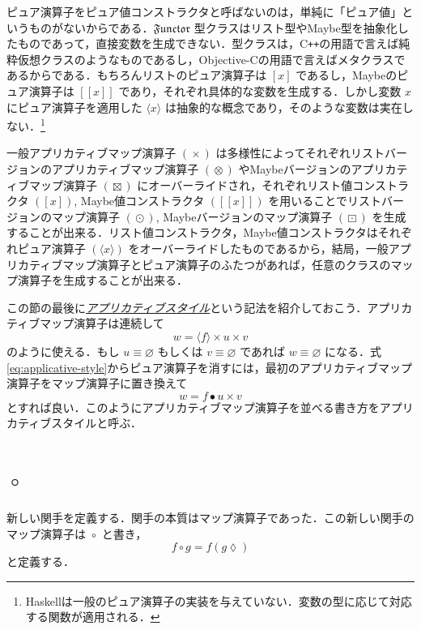 \documentclass[a4paper]{jsbook}
\def\[{\left[\!\left[}
\def\]{\right]\!\right]}
\newcommand{\programminglanguage}[1]{\textsf{#1}}
\newcommand{\cxx}{\programminglanguage{C}\texttt{++}}
\newcommand{\objectivec}{\programminglanguage{Objective-C}}
\newcommand{\haskell}{\programminglanguage{Haskell}}
\newcommand{\keyword}[1]{{\underline{\emph{#1}}}}
\newcommand{\mListWith}[1]{\left[#1\right]}
\newcommand{\mMaybeWith}[1]{\[#1\]}
\newcommand{\mPureWith}[1]{\langle#1\rangle}
\newcommand{\mSpecialTypeClass}[1]{\mathfrak{#1}} %
\newcommand{\mFunctorTypeClass}{\mSpecialTypeClass{Functor}}
\newcommand{\mPureNothing}{\varnothing}
\newcommand{\mAnonParameter}{\lozenge}
\DeclareMathOperator{\mMap}{\bullet}
\DeclareMathOperator{\mMapList}{\odot}
\DeclareMathOperator{\mMapMaybe}{\boxdot}
\DeclareMathOperator{\mMapFunc}{\circ}
\DeclareMathOperator{\mAppMap}{\times}
\DeclareMathOperator{\mAppMapList}{\otimes}
\DeclareMathOperator{\mAppMapMaybe}{\boxtimes}
\begin{document}
ピュア演算子をピュア値コンストラクタと呼ばないのは，単純に「ピュア値」というものがないからである．$\mFunctorTypeClass$ 型クラスはリスト型やMaybe型を抽象化したものであって，直接変数を生成できない．型クラスは，\cxx の用語で言えば純粋仮想クラスのようなものであるし，\objectivec の用語で言えばメタクラスであるからである．もちろんリストのピュア演算子は $\mListWith{x}$ であるし，Maybeのピュア演算子は $\mMaybeWith{x}$ であり，それぞれ具体的な変数を生成する．しかし変数 $x$ にピュア演算子を適用した $\mPureWith{x}$ は抽象的な概念であり，そのような変数は実在しない．\footnote{\haskell は一般のピュア演算子の実装を与えていない．変数の型に応じて対応する関数が適用される．}

一般アプリカティブマップ演算子 $(\mAppMap)$ は多様性によってそれぞれリストバージョンのアプリカティブマップ演算子 $(\mAppMapList)$ やMaybeバージョンのアプリカティブマップ演算子 $(\mAppMapMaybe)$ にオーバーライドされ，それぞれリスト値コンストラクタ $(\mListWith{x})$, Maybe値コンストラクタ $(\mMaybeWith{x})$ を用いることでリストバージョンのマップ演算子 $(\mMapList)$, Maybeバージョンのマップ演算子 $(\mMapMaybe)$ を生成することが出来る．リスト値コンストラクタ，Maybe値コンストラクタはそれぞれピュア演算子 $(\mPureWith{x})$ をオーバーライドしたものであるから，結局，一般アプリカティブマップ演算子とピュア演算子のふたつがあれば，任意のクラスのマップ演算子を生成することが出来る．

この節の最後に\keyword{アプリカティブスタイル}という記法を紹介しておこう．アプリカティブマップ演算子は連続して
\begin{equation}
\label{eq:applicative-style}
w=\mPureWith{f}\mAppMap u\mAppMap v
\end{equation}
のように使える．もし $u\equiv\mPureNothing$ もしくは $v\equiv\mPureNothing$ であれば $w\equiv\mPureNothing$ になる．式\eqref{eq:applicative-style}からピュア演算子を消すには，最初のアプリカティブマップ演算子をマップ演算子に置き換えて
\begin{equation}
w=f\mMap u\mAppMap v
\end{equation}
とすれば良い．このようにアプリカティブマップ演算子を並べる書き方をアプリカティブスタイルと呼ぶ．

\section{$\mMapFunc$}

新しい関手を定義する．関手の本質はマップ演算子であった．この新しい関手のマップ演算子は $\mMapFunc$ と書き， 
\begin{equation}
f\mMapFunc g=f(g\mAnonParameter)
\end{equation}
と定義する．
\end{document}
